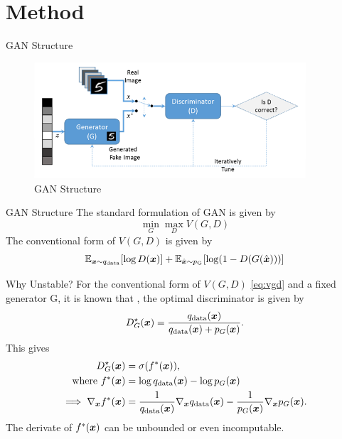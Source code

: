 \documentclass[xcolor={svgnames}]{beamer}
\begin{document}
\section{Method}
\begin{frame}{GAN Structure}
  \begin{figure}[th]
    \centering
    \includegraphics[width=0.9\textwidth]{figures/gan_model.png}
    \caption{GAN Structure}
    \label{fig:gan_model}
  \end{figure}
\end{frame}
\begin{frame}{GAN Structure}
  The standard formulation of GAN is given by
  \[
    \min_G\max_D V(G, D)
  \]
  The conventional form of $V(G, D)$ is given by
  \begin{equation}
    \label{eq:vgd}
    \mathbb{E}{}_{\boldsymbol{x}\sim q_{\mathrm{data}}}[\log D(\boldsymbol{x})]
    + \mathbb{E}{}_{\hat{\boldsymbol{x}} \sim p_{\mathrm{G}}}[\log(1-D(G(\hat{\boldsymbol{x}})))]
  \end{equation}
\end{frame}
\begin{frame}{Why Unstable?}
  For the conventional form of $V(G, D)$ \eqref{eq:vgd} and a fixed generator
  G, it is known that \cite{goodfellow2014generative}, the optimal discriminator
  is given by
  \[
    D^{\star}_G(\boldsymbol{x}) = 
    \frac{q_{\mathrm{data}}(\boldsymbol{x})}
    {q_{\mathrm{data}}(\boldsymbol{x}) + p_G(\boldsymbol{x})}.
  \]
  This gives
  \[
    \begin{split}
      D^{\star}_G(\boldsymbol{x}) &= \sigma(f^*(\boldsymbol{x})), \\
      \text{where } 
      f^*(\boldsymbol{x}) &= \log q_{\mathrm{data}}(\boldsymbol{x}) - \log p_G(\boldsymbol{x}) \\
      \implies \nabla_{\boldsymbol{x}}f^*(\boldsymbol{x}) &=
      \frac{1}{q_{\mathrm{data}}(\boldsymbol{x})}
      \nabla_{\boldsymbol{x}}q_{\mathrm{data}}(\boldsymbol{x})
      -
      \frac{1}{p_G(\boldsymbol{x})}\nabla_{\boldsymbol{x}}p_G(\boldsymbol{x}).
    \end{split}
  \]
  \alert{The derivate of $f^*(\boldsymbol{x})$ can be unbounded or even incomputable.}
\end{frame}
\end{document}
